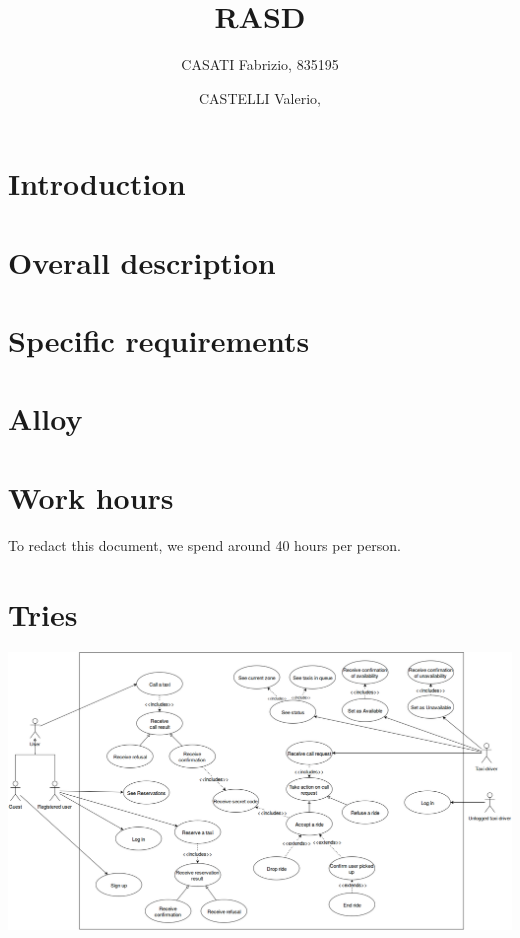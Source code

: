 




\title{RASD}
\author{
	CASATI Fabrizio, 835195
	\and
	CASTELLI Valerio, 
}

\maketitle
\tableofcontents

\chapter{Introduction}


\chapter{Overall description}


\chapter{Specific requirements}


\begin{appendices}
\chapter{Alloy}


\chapter{Work hours}
To redact this document, we spend around 40 hours per person.

\chapter{Tries}
\begin{landscape}
    \includegraphics[width=580pt, keepaspectratio]{files/index.png}
    \label{fig:PropProf}
\end{landscape}


\end{appendices}

